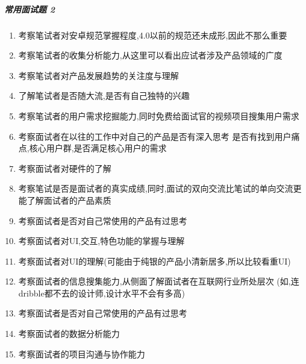\documentclass[letterpaper,10pt,english]{sphinxmanual}
\begin{document}
\subparagraph{常用面试题 2\sphinxfootnotemark[851]}
\label{\detokenize{chapter_interview/exam:id14}}%
\begin{footnotetext}[851]\sphinxAtStartFootnote
{}
%
\end{footnotetext}\ignorespaces \begin{enumerate}
%
\item {} 
考察笔试者对安卓规范掌握程度,4.0以前的规范还未成形,因此不那么重要

\item {} 
考察笔试者的收集分析能力,从这里可以看出应试者涉及产品领域的广度

\item {} 
考察笔试者对产品发展趋势的关注度与理解

\item {} 
了解笔试者是否随大流,是否有自己独特的兴趣

\item {} 
考察笔试者的用户需求挖掘能力,同时免费给面试官的视频项目搜集用户需求

\item {} 
考察面试者在以往的工作中对自己的产品是否有深入思考
是否有找到用户痛点,核心用户群,是否满足核心用户的需求

\item {} 
考察面试者对硬件的了解

\item {} 
考察笔试是否是面试者的真实成绩,同时,面试的双向交流比笔试的单向交流更能了解面试者的产品素质

\item {} 
考察面试者是否对自己常使用的产品有过思考

\item {} 
考察面试者对UI,交互,特色功能的掌握与理解

\item {} 
考察面试者对UI的理解(可能由于纯银的产品小清新居多,所以比较看重UI)

\item {} 
考察面试者的信息搜集能力,从侧面了解面试者在互联网行业所处层次
(如,连dribble都不去的设计师,设计水平不会有多高)

\item {} 
考察面试者是否对自己常使用的产品有过思考

\item {} 
考察面试者的数据分析能力

\item {} 
考察面试者的项目沟通与协作能力

\end{enumerate}
\end{document}
